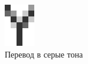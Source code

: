 \documentclass[russian,utf8,emptystyle]{eskdtext}
\begin{document}
\begin{figure}[!htb]
\includegraphics[width=\linewidth]{input-ex-grayscale}
\caption{Перевод в серые тона}
\endminipage\hfill
{}

\end{figure}
\end{document}
